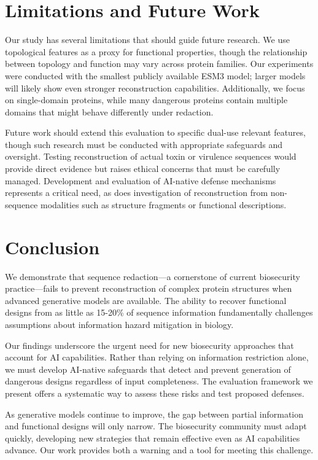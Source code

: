 \documentclass{article}
\begin{document}
\section{Limitations and Future Work}

Our study has several limitations that should guide future research. We use topological features as a proxy for functional properties, though the relationship between topology and function may vary across protein families. Our experiments were conducted with the smallest publicly available ESM3 model; larger models will likely show even stronger reconstruction capabilities. Additionally, we focus on single-domain proteins, while many dangerous proteins contain multiple domains that might behave differently under redaction.

Future work should extend this evaluation to specific dual-use relevant features, though such research must be conducted with appropriate safeguards and oversight. Testing reconstruction of actual toxin or virulence sequences would provide direct evidence but raises ethical concerns that must be carefully managed. Development and evaluation of AI-native defense mechanisms represents a critical need, as does investigation of reconstruction from non-sequence modalities such as structure fragments or functional descriptions.

\section{Conclusion}

We demonstrate that sequence redaction—a cornerstone of current biosecurity practice—fails to prevent reconstruction of complex protein structures when advanced generative models are available. The ability to recover functional designs from as little as 15-20\% of sequence information fundamentally challenges assumptions about information hazard mitigation in biology.

Our findings underscore the urgent need for new biosecurity approaches that account for AI capabilities. Rather than relying on information restriction alone, we must develop AI-native safeguards that detect and prevent generation of dangerous designs regardless of input completeness. The evaluation framework we present offers a systematic way to assess these risks and test proposed defenses.

As generative models continue to improve, the gap between partial information and functional designs will only narrow. The biosecurity community must adapt quickly, developing new strategies that remain effective even as AI capabilities advance. Our work provides both a warning and a tool for meeting this challenge.
\end{document}
